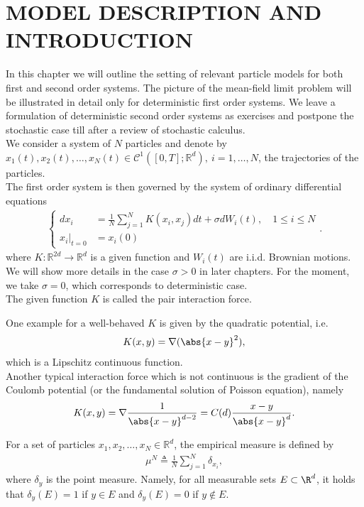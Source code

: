 \chapter{MODEL DESCRIPTION AND INTRODUCTION}
In this chapter we will outline the setting of relevant particle models for both first and second order systems.
The picture of the mean-field limit problem will be illustrated in detail only for deterministic first order systems.
We leave a formulation of deterministic second order systems as exercises and postpone the stochastic case till after a
review of stochastic calculus.\\[1ex]
We consider a system of $N$ particles and denote by $x_{1}(t),x_{2}(t),\ldots,x_N(t) \in  \mathcal{C}^{1}([0,T];\mathbb{R}^{d} ),\ i=1,\ldots ,N $,
the trajectories of the particles.\\[1ex]
The first order system is then governed by the system of ordinary differential equations
\begin{align*}
	\begin{cases}
		d x_i           & = \frac{1}{N}\sum_{j=1}^{N} K(x_{i},x_{j}) dt + \sigma dW_i(t), \quad 1\le i \le N \\
		x_i\rvert_{t=0} & = x_i(0)
	\end{cases}
	.\end{align*}
where $K : \mathbb{R}^{2d} \to \mathbb{R}^{d}  $ is a given function and $W_i(t)$ are i.i.d. Brownian motions. We will show more details in the case $\sigma>0$ in later chapters.
For the moment, we take $\sigma  = 0$, which corresponds to deterministic case.\\[1ex]
The given function $K$ is called the pair interaction force.
\begin{example}
	One example for a well-behaved $K$ is given by the quadratic potential, i.e.
	\begin{align*}
		K(x,y) =  \nabla (\abs{x-y}^2),
	\end{align*}
	which is a Lipschitz continuous function. \\[1ex]
	Another typical interaction force which is not continuous
	is the gradient of the Coulomb potential (or the fundamental solution of Poisson equation), namely
	\begin{align*}
		K(x,y) = \nabla \frac{1}{\abs{x-y}^{d-2}} = C(d) \frac{x-y}{\abs{x-y}^{d} }
		.\end{align*}
\end{example}
\begin{definition}\label{empirical_measure}
	For a set of particles $x_{1},x_{2},\ldots,x_N \in \mathbb{R}^{d}$, the empirical measure is defined by
	\begin{align*}
		\mu^{N} \triangleq \frac{1}{N} \sum_{j=1}^{N} \delta_{x_i},
	\end{align*}
	where $\delta_y$ is the point measure. Namely, for all measurable sets $E\subset \R^d$, it holds that $\delta_y(E)=1$ if $y\in E$ and $\delta_y(E)=0$ if $y\not\in E$.
\end{definition}
